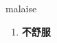 
\begin{frame}
{\huge malaise}
\begin{center}
\begin{enumerate}\Large
  \item \textbf{不舒服}
\end{enumerate}
\end{center}
\end{frame}
